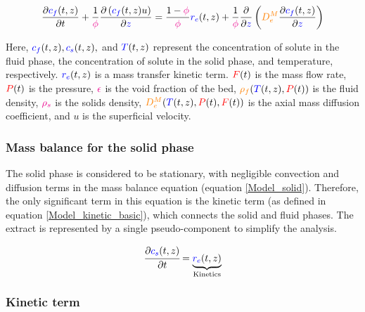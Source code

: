 \documentclass[../Article_Model_Parameters.tex]{subfiles}
\begin{document}
	{\footnotesize
		\begin{equation}
			\label{Model_fluid}
			\frac{\partial {\color{blue}c_f}(t,z)}{\partial t}
			+ \frac{1}{{\color{magenta}\phi}} \frac{\partial \left( {\color{blue}c_f}(t,z) u\right)}{\partial {\color{blue}z}}
			= \frac{1-{\color{magenta}\phi}}{{\color{magenta}\phi}} {\color{blue}r_e}(t,z)
			+ \frac{1}{{\color{magenta}\phi}} \frac{\partial}{\partial {\color{blue}z}} \left( {\color{orange}D^M_e} \frac{\partial {\color{blue}c_f}(t,z)}{\partial {\color{blue}z}} \right)
		\end{equation}
	}
	
	Here, ${\color{blue}c_f}(t,z), {\color{blue}c_s}(t,z),$ and ${\color{blue}T}(t,z)$ represent the concentration of solute in the fluid phase, the concentration of solute in the solid phase, and temperature, respectively. ${\color{blue}r_e}(t,z)$ is a mass transfer kinetic term. ${\color{red}F}(t)$ is the mass flow rate, ${\color{red}P}(t)$ is the pressure, ${\color{magenta}\epsilon}$ is the void fraction of the bed, ${\color{orange}\rho_f}({\color{blue}T}(t,z),{\color{red}P}(t))$ is the fluid density, ${\color{magenta}\rho_s}$ is the solids density, ${\color{orange}D^M_e}({\color{blue}T}(t,z),{\color{red}P}(t),{\color{red}F}(t))$ is the axial mass diffusion coefficient, and $u$ is the superficial velocity.
	
	\subsubsection{Mass balance for the solid phase} \label{Mass_balance_solid}
	
	The solid phase is considered to be stationary, with negligible convection and diffusion terms in the mass balance equation (equation \ref{Model_solid}). Therefore, the only significant term in this equation is the kinetic term (as defined in equation \ref{Model_kinetic_basic}), which connects the solid and fluid phases. The extract is represented by a single pseudo-component to simplify the analysis. 
	
	{\footnotesize
		\begin{equation} 
			\label{Model_solid}
					\cfrac{\partial {\color{blue}c_s}(t,z)}{\partial t} = \underbrace{ {\color{blue}r_e}(t,z) }_{\text{Kinetics}}
			\end{equation} }
			
	\subsubsection{Kinetic term} \label{CH: Kinetic}
	
\end{document}
